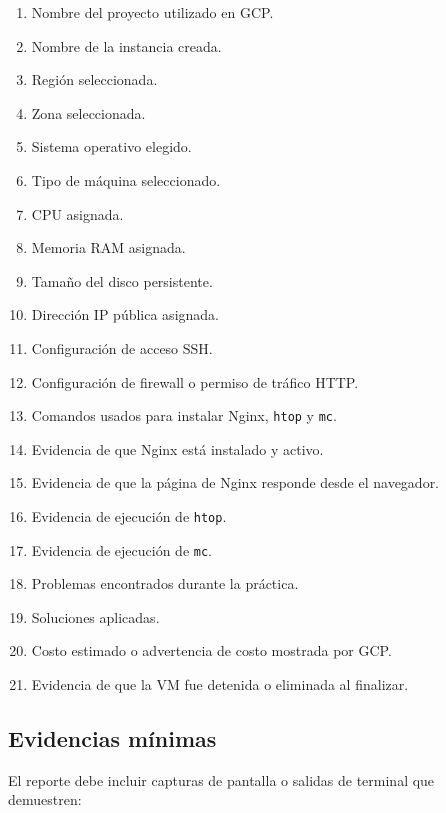 \documentclass[
  coursetitle={Cómputo Nube y Tecnologías Emergentes},
  coursehours={96},
  coursedate={Verano 2026},
  doctype={Tarea 2},
  otherlangs={english,french},
  authorname={Lázaro},
  authorsurname={Bustio-Martínez},
  authortitle={PhD},
  role={Profesor Investigador},
  email={lbustio@inaoe.mx},
  phone={5559504000},
  ext={7459},
  institution={Instituto Nacional de Astrofísica, Óptica y Electrónica (INAOE)},
  department={Maestría en Ciencias en Tecnologías de Seguridad},
  address={Luis Enrique Erro 1, Sta. Ma. Tonantzintla, San Andrés Cholula, CP 72840, Puebla, México},
  margin={0.5in}
]{../../../lbustio_lecture_notes}
\begin{document}
\begin{enumerate}
  \item Nombre del proyecto utilizado en GCP.
  \item Nombre de la instancia creada.
  \item Región seleccionada.
  \item Zona seleccionada.
  \item Sistema operativo elegido.
  \item Tipo de máquina seleccionado.
  \item CPU asignada.
  \item Memoria RAM asignada.
  \item Tamaño del disco persistente.
  \item Dirección IP pública asignada.
  \item Configuración de acceso SSH.
  \item Configuración de firewall o permiso de tráfico HTTP.
  \item Comandos usados para instalar Nginx, \texttt{htop} y \texttt{mc}.
  \item Evidencia de que Nginx está instalado y activo.
  \item Evidencia de que la página de Nginx responde desde el navegador.
  \item Evidencia de ejecución de \texttt{htop}.
  \item Evidencia de ejecución de \texttt{mc}.
  \item Problemas encontrados durante la práctica.
  \item Soluciones aplicadas.
  \item Costo estimado o advertencia de costo mostrada por GCP.
  \item Evidencia de que la VM fue detenida o eliminada al finalizar.
\end{enumerate}

\subsection{Evidencias mínimas}
\label{sec:tarea2-evidencias}

El reporte debe incluir capturas de pantalla o salidas de terminal que demuestren:
\end{document}

